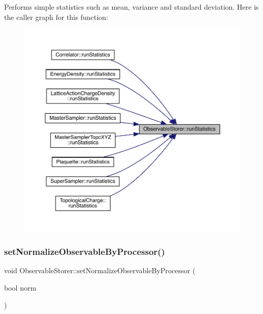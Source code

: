 Performs simple statistics such as mean, variance and standard deviation. Here is the caller graph for this function\+:
\nopagebreak
\begin{figure}[H]
\begin{center}
\leavevmode
\includegraphics[width=350pt]{class_observable_storer_a41b3756b423d31c6535d2981ef92d1a1_icgraph}
\end{center}
\end{figure}
\mbox{\label{class_observable_storer_a6177ade7609fb0e4b739955eecba20e6}} 
\subsubsection{\texorpdfstring{setNormalizeObservableByProcessor()}{setNormalizeObservableByProcessor()}}
{\footnotesize\ttfamily void Observable\+Storer\+::set\+Normalize\+Observable\+By\+Processor (\begin{DoxyParamCaption}\item[{bool}]{norm }\end{DoxyParamCaption})\hspace{0.3cm}{\ttfamily [inline]}}

